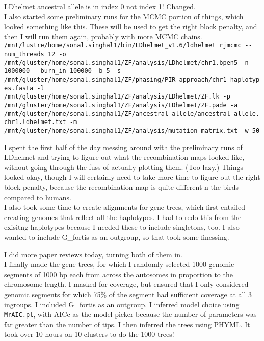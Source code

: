 \documentclass[idxtotoc,hyperref,openany,oneside]{labbook} %
\begin{document}
LDhelmet ancestral allele is in index 0 not index 1! Changed. \\

I also started some preliminary runs for the MCMC portion of things, which looked something like this. These will be used to get the right block penalty, and then I will run them again, probably with more MCMC chains.
\verb+/mnt/lustre/home/sonal.singhal1/bin/LDhelmet_v1.6/ldhelmet rjmcmc --num_threads 12 -o /mnt/gluster/home/sonal.singhal1/ZF/analysis/LDhelmet/chr1.bpen5 -n 1000000 --burn_in 100000 -b 5 -s /mnt/gluster/home/sonal.singhal1/ZF/phasing/PIR_approach/chr1_haplotypes.fasta -l /mnt/gluster/home/sonal.singhal1/ZF/analysis/LDhelmet/ZF.lk -p /mnt/gluster/home/sonal.singhal1/ZF/analysis/LDhelmet/ZF.pade -a /mnt/gluster/home/sonal.singhal1/ZF/ancestral_allele/ancestral_allele.chr1.ldhelmet.txt -m /mnt/gluster/home/sonal.singhal1/ZF/analysis/mutation_matrix.txt -w 50+ 

I spent the first half of the day messing around with the preliminary runs of LDhelmet and trying to figure out what the recombination maps looked like, without going through the fuss of actually plotting them. (Too lazy.) Things looked okay, though I will certainly need to take more time to figure out the right block penalty, because the recombination map is quite different n the birds compared to humans. \\

I also took some time to create alignments for gene trees, which first entailed creating genomes that reflect all the haplotypes. I had to redo this from the exisitng haplotypes because I needed these to include singletons, too. I also wanted to include G\_fortis as an outgroup, so that took some finessing.

I did more paper reviews today, turning both of them in. \\

I finally made the gene trees, for which I randomly selected 1000 genomic segments of 1000 bp each from across the autosomes in proportion to the chromosome length. I masked for coverage, but ensured that I only considered genomic segments for which 75\% of the segment had sufficient coverage at all 3 ingroups. I included G\_fortis as an outgroup. I inferred model choice using \verb+MrAIC.pl+, with AICc as the model picker because the number of parameters was far greater than the number of tips. I then inferred the trees using PHYML. It took over 10 hours on 10 clusters to do the 1000 trees! \\
\end{document}
